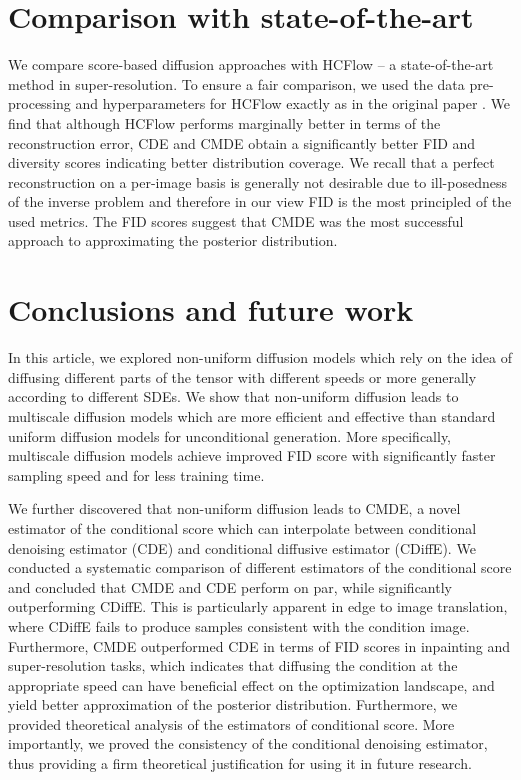     

\section{Comparison with state-of-the-art}
We compare score-based diffusion approaches with HCFlow \cite{liang2021hrflow} -- a state-of-the-art method in super-resolution. To ensure a fair comparison, we used the data pre-processing and hyperparameters for HCFlow exactly as in the original paper \cite{liang2021hrflow}. We find that although HCFlow performs marginally better in terms of the reconstruction error, CDE and CMDE obtain a significantly better FID and diversity scores indicating better distribution coverage. 
We recall that a perfect reconstruction on a per-image basis is generally not desirable due to ill-posedness of the inverse problem and therefore in our view FID is the most principled of the used metrics.
The FID scores suggest that CMDE was the most successful approach to approximating the posterior distribution.




\section{Conclusions and future work}

In this article, we explored non-uniform diffusion models which rely on the idea of diffusing different parts of the tensor with different speeds or more generally according to different SDEs. We show that non-uniform diffusion leads to multiscale diffusion models which are more efficient and effective than standard uniform diffusion models for unconditional generation. More specifically, multiscale diffusion models achieve improved FID score with significantly faster sampling speed and for less training time.

We further discovered that non-uniform diffusion leads to CMDE, a novel estimator of the conditional score which can interpolate between conditional denoising estimator (CDE) and conditional diffusive estimator (CDiffE). We conducted a systematic comparison of different estimators of the conditional score and concluded that CMDE and CDE perform on par, while significantly outperforming CDiffE. This is particularly apparent in edge to image translation, where CDiffE fails to produce samples consistent with the condition image. Furthermore, CMDE outperformed CDE in terms of FID scores in inpainting and super-resolution tasks, which indicates that diffusing the condition at the appropriate speed can have beneficial effect on the optimization landscape, and yield better approximation of the posterior distribution. Furthermore, we provided theoretical analysis of the estimators of conditional score. More importantly, we proved the consistency of the conditional denoising estimator, thus providing a firm theoretical justification for using it in future research. 



